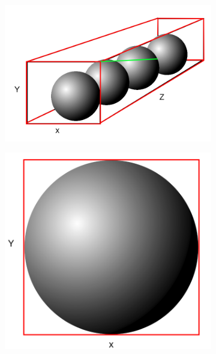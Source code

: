 \documentclass[11pt,a4paper]{article}
\begin{document}
\begin{figure}[H]	
     \centering
     \begin{subfigure}[t]{0.3\textwidth}
         \centering
         \includegraphics[width=\textwidth]{images/longaxis.png}
         \caption{}
         \label{fig:pi_4000}
     \end{subfigure}
     \hfill
     \begin{subfigure}[t]{0.3\textwidth}
         \centering
         \includegraphics[width=\textwidth]{images/LONGAXIS_Y.png}
         \caption{}
         \label{fig:pi_5000}
     \end{subfigure}

\end{figure}
\end{document}

